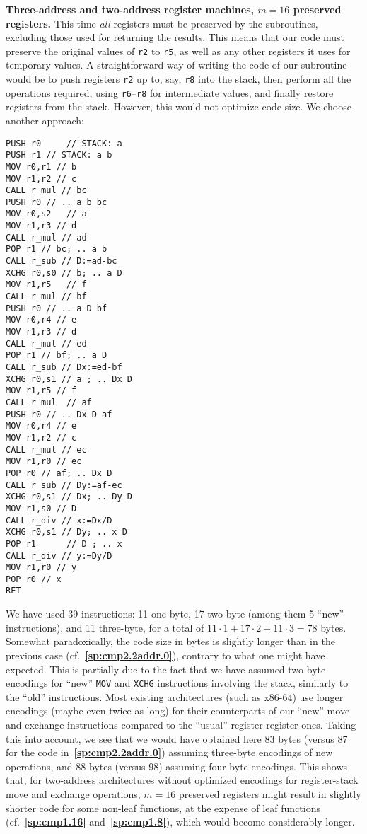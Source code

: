 \documentclass[12pt,oneside]{article}
\def\makepoint#1{\medbreak\noindent{\bf #1.\ }}
\def\nxsubpoint{\refstepcounter{subsubsection}%
    \smallbreak\makepoint{\thesubsubsection}}
\def\refpoint#1{{\rm\textbf{\ref{#1}}}}
\let\ptref=\refpoint
\def\emb#1{\textbf{#1.}}
\begin{document}
\nxsubpoint\label{sp:cmp2.2addr.16}\emb{Three-address and two-address register machines, $m=16$ preserved registers}
This time {\em all\/} registers must be preserved by the subroutines, excluding those used for returning the results. This means that our code must preserve the original values of \texttt{r2} to \texttt{r5}, as well as any other registers it uses for temporary values. A straightforward way of writing the code of our subroutine would be to push registers \texttt{r2} up to, say, \texttt{r8} into the stack, then perform all the operations required, using \texttt{r6}--\texttt{r8} for intermediate values, and finally restore registers from the stack. However, this would not optimize code size. We choose another approach:

\begin{verbatim}
PUSH r0     // STACK: a
PUSH r1 // STACK: a b
MOV r0,r1 // b
MOV r1,r2 // c
CALL r_mul // bc
PUSH r0 // .. a b bc
MOV r0,s2   // a
MOV r1,r3 // d
CALL r_mul // ad
POP r1 // bc; .. a b
CALL r_sub // D:=ad-bc
XCHG r0,s0 // b; .. a D
MOV r1,r5   // f
CALL r_mul // bf
PUSH r0 // .. a D bf
MOV r0,r4 // e
MOV r1,r3 // d
CALL r_mul // ed
POP r1 // bf; .. a D
CALL r_sub // Dx:=ed-bf
XCHG r0,s1 // a ; .. Dx D
MOV r1,r5 // f
CALL r_mul  // af
PUSH r0 // .. Dx D af
MOV r0,r4 // e
MOV r1,r2 // c
CALL r_mul // ec
MOV r1,r0 // ec
POP r0 // af; .. Dx D
CALL r_sub // Dy:=af-ec
XCHG r0,s1 // Dx; .. Dy D
MOV r1,s0 // D
CALL r_div // x:=Dx/D
XCHG r0,s1 // Dy; .. x D
POP r1      // D ; .. x
CALL r_div // y:=Dy/D
MOV r1,r0 // y
POP r0 // x
RET
\end{verbatim}
We have used 39 instructions: 11 one-byte, 17 two-byte (among them 5 ``new'' instructions), and 11 three-byte, for a total of $11\cdot1+17\cdot2+11\cdot3=78$ bytes. Somewhat paradoxically, the code size in bytes is slightly longer than in the previous case (cf.~\ptref{sp:cmp2.2addr.0}), contrary to what one might have expected. This is partially due to the fact that we have assumed two-byte encodings for ``new'' \texttt{MOV} and \texttt{XCHG} instructions involving the stack, similarly to the ``old'' instructions. Most existing architectures (such as x86-64) use longer encodings (maybe even twice as long) for their counterparts of our ``new'' move and exchange instructions compared to the ``usual'' register-register ones. Taking this into account, we see that we would have obtained here 83 bytes (versus 87 for the code in~\ptref{sp:cmp2.2addr.0}) assuming three-byte encodings of new operations, and 88 bytes (versus 98) assuming four-byte encodings. This shows that, for two-address architectures without optimized encodings for register-stack move and exchange operations, $m=16$ preserved registers might result in slightly shorter code for some non-leaf functions, at the expense of leaf functions (cf.~\ptref{sp:cmp1.16} and~\ptref{sp:cmp1.8}), which would become considerably longer.
\end{document}
